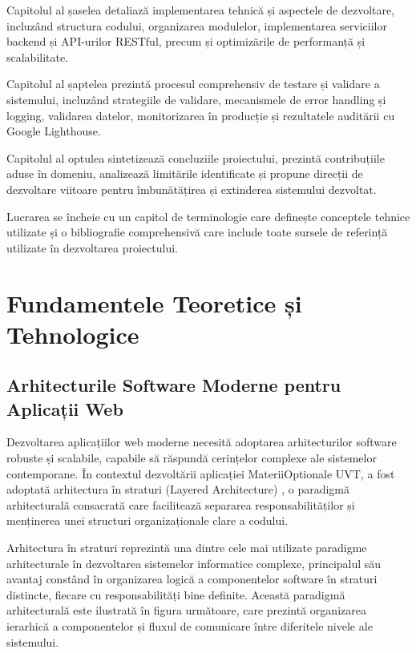 \documentclass[12pt,a4paper]{report}
\begin{document}
Capitolul al șaselea detaliază implementarea tehnică și aspectele de dezvoltare, incluzând structura codului, organizarea modulelor, implementarea serviciilor backend și API-urilor RESTful, precum și optimizările de performanță și scalabilitate.

Capitolul al șaptelea prezintă procesul comprehensiv de testare și validare a sistemului, incluzând strategiile de validare, mecanismele de error handling și logging, validarea datelor, monitorizarea în producție și rezultatele auditării cu Google Lighthouse.

Capitolul al optulea sintetizează concluziile proiectului, prezintă contribuțiile aduse în domeniu, analizează limitările identificate și propune direcții de dezvoltare viitoare pentru îmbunătățirea și extinderea sistemului dezvoltat.

Lucrarea se încheie cu un capitol de terminologie care definește conceptele tehnice utilizate și o bibliografie comprehensivă care include toate sursele de referință utilizate în dezvoltarea proiectului.

\chapter{Fundamentele Teoretice și Tehnologice}

\section{Arhitecturile Software Moderne pentru Aplicații Web}

Dezvoltarea aplicațiilor web moderne necesită adoptarea arhitecturilor software robuste și scalabile, capabile să răspundă cerințelor complexe ale sistemelor contemporane. În contextul dezvoltării aplicației MateriiOptionale UVT, a fost adoptată arhitectura în straturi (Layered Architecture) \cite{layered-architecture}, o paradigmă arhitecturală consacrată care facilitează separarea responsabilităților și menținerea unei structuri organizaționale clare a codului.

Arhitectura în straturi reprezintă una dintre cele mai utilizate paradigme arhitecturale în dezvoltarea sistemelor informatice complexe, principalul său avantaj constând în organizarea logică a componentelor software în straturi distincte, fiecare cu responsabilități bine definite. Această paradigmă arhitecturală este ilustrată în figura următoare, care prezintă organizarea ierarhică a componentelor și fluxul de comunicare între diferitele nivele ale sistemului.
\end{document}

